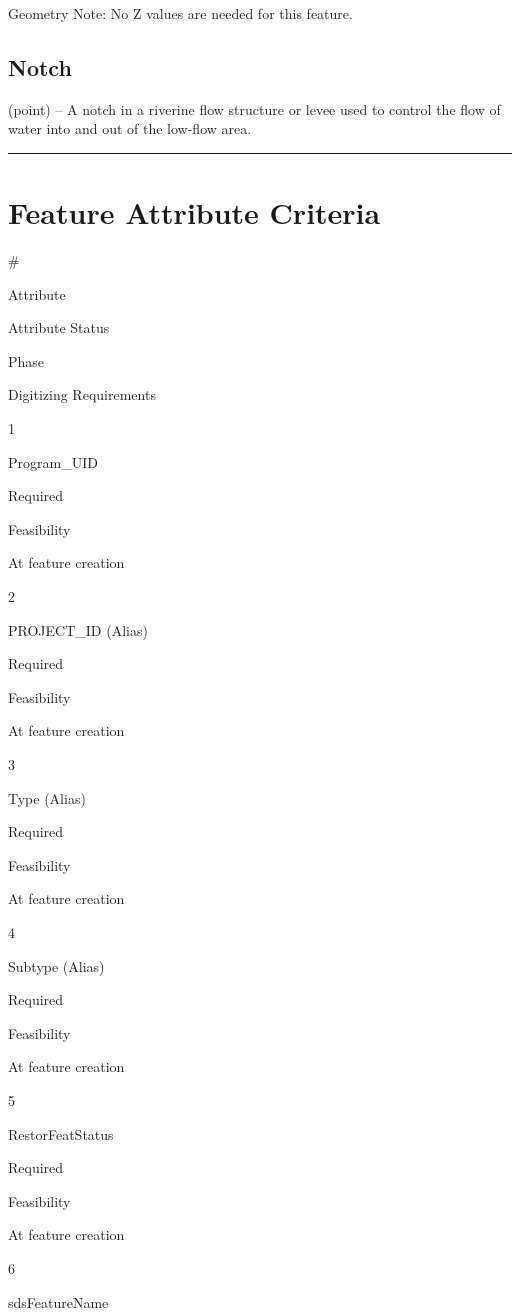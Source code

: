 \documentclass[
  letterpaper,
  DIV=11,
  numbers=noendperiod]{scrreprt}
\begin{document}
Geometry Note: No Z values are needed for this feature.

\subsection{Notch}\label{notch-1}

(point) -- A notch in a riverine flow structure or levee used to control
the flow of water into and out of the low-flow area.

\begin{center}\rule{0.5\linewidth}{0.5pt}\end{center}

\section{Feature Attribute Criteria}\label{feature-attribute-criteria-9}

\#

Attribute

Attribute Status

Phase

Digitizing Requirements

1

Program\_UID

Required

Feasibility

At feature creation

2

PROJECT\_ID (Alias)

Required

Feasibility

At feature creation

3

Type (Alias)

Required

Feasibility

At feature creation

4

Subtype (Alias)

Required

Feasibility

At feature creation

5

RestorFeatStatus

Required

Feasibility

At feature creation

6

sdsFeatureName
\end{document}
